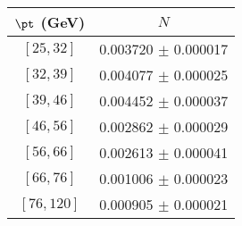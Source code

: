 \begin{tabular}{c||c}
$\pt$ (GeV) & $N$  \\
\hline
$[25, 32]$ & 0.003720 $\pm$ 0.000017\\
$[32, 39]$ & 0.004077 $\pm$ 0.000025\\
$[39, 46]$ & 0.004452 $\pm$ 0.000037\\
$[46, 56]$ & 0.002862 $\pm$ 0.000029\\
$[56, 66]$ & 0.002613 $\pm$ 0.000041\\
$[66, 76]$ & 0.001006 $\pm$ 0.000023\\
$[76, 120]$ & 0.000905 $\pm$ 0.000021\\
\end{tabular}

